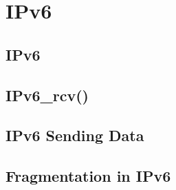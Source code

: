 \section{IPv6}

\subsection{IPv6}

\subsection{IPv6\_rcv()}

\subsection{IPv6 Sending Data}

\subsection{Fragmentation in IPv6}
